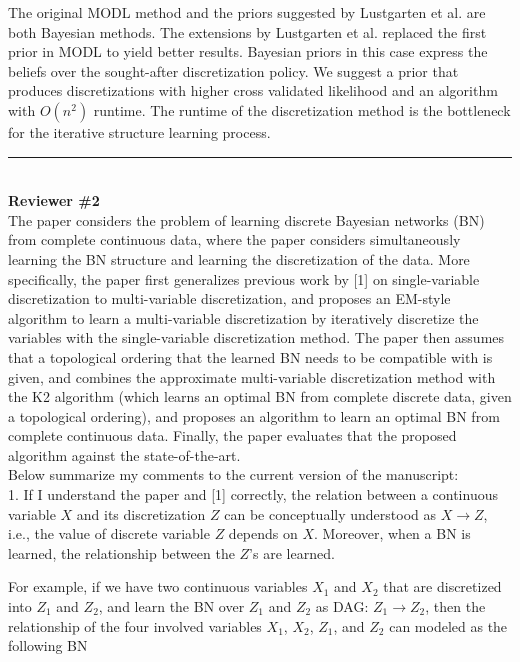 \documentclass{article}
\begin{document}
The original MODL method and the priors suggested by Lustgarten et al. are both Bayesian methods.
The extensions by Lustgarten et al. replaced the first prior in MODL to yield better results.
Bayesian priors in this case express the beliefs over the sought-after discretization policy.
We suggest a prior that produces discretizations with higher cross validated likelihood and an algorithm with $O(n^2)$ runtime.
The runtime of the discretization method is the bottleneck for the iterative structure learning process.

\noindent\rule{8cm}{0.4pt}\\
{\bf Reviewer \#2} \\

 The paper considers the problem of learning discrete Bayesian networks (BN) from complete continuous data, where the paper considers simultaneously learning the BN structure and learning the discretization of the data. More specifically, the paper first generalizes previous work by [1] on single-variable discretization to multi-variable discretization, and proposes an EM-style algorithm to learn a multi-variable discretization by iteratively discretize the variables with the single-variable discretization method. The paper then assumes that a topological ordering that the learned BN needs to be compatible with is given, and combines the approximate multi-variable discretization method with the K2 algorithm (which learns an optimal BN from complete discrete data, given a topological ordering), and proposes an algorithm to learn an optimal BN from complete continuous data. Finally, the paper evaluates that the proposed algorithm against the state-of-the-art.\\
 
 Below summarize my comments to the current version of the manuscript:\\

1. If I understand the paper and [1] correctly, the relation between a continuous variable $X$ and its discretization $Z$ can be conceptually
understood as $X \rightarrow Z$, i.e., the value of discrete variable $Z$ depends on $X$. Moreover, when a BN is learned, the relationship between the $Z$'s are learned.

For example, if we have two continuous variables $X_1$ and $X_2$ that are discretized into $Z_1$ and $Z_2$, and learn the BN over $Z_1$ and $Z_2$ as DAG: $Z_1 \rightarrow Z_2$, then the relationship of the four involved variables $X_1$, $X_2$, $Z_1$, and $Z_2$ can modeled as the following BN
\end{document}
